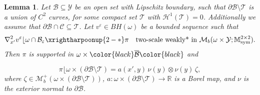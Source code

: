 \documentclass[reqno,10pt]{amsart}
\numberwithin{equation}{section}
\newtheorem{lemma}[theorem]{Lemma}
\theoremstyle{remark}
\newcommand{\RED}{\color{black}}
\newcommand{\BLACK}{\color{black}}
\newcommand{\calB}{\mathcal{B}}
\newcommand{\calC}{\mathcal{C}}
\newcommand{\calH}{\mathcal{H}}
\newcommand{\M}{\mathbb{M}}
\newcommand{\R}{\mathbb{R}}
\newcommand{\calT}{\mathcal{T}}
\newcommand{\calY}{\mathcal{Y}}
\DeclareMathOperator{\sym}{sym}
\newcommand{\closure}[1]{\overline{#1}}
\newcommand{\weakstartwoscale}{\xrightharpoonup{2-*}}
\newcommand{\eps}{\varepsilon}
\newcommand{\Mb}{\mathcal{M}_b}
\newcommand{\mres}[1]{\lfloor{#1}}
\newcommand{\D}{\nabla}
\begin{document}
\begin{lemma} \label{two-scale rank-1 lemma BH}
Let $\calB \subseteq \calY$ be an open set with Lipschitz boundary, such that $\partial\calB \setminus \calT$ is a union of
$C^2$ curves, 
for some compact set $\calT$ with $\calH^{1}(\calT) = 0$. 
Additionally we assume that $\partial\calB \cap \calC \subseteq \calT$. 
Let $v^\eps \in BH(\omega)$ be a bounded sequence such that 
\begin{equation*}
	{\D}^2_{x'}v^\eps\mres{\omega \cap \calB_\eps} \weakstartwoscale \pi \quad \text{two-scale weakly* in $\Mb(\omega \times \calY;\M^{2 \times 2}_{\sym})$}.
\end{equation*}
Then $\pi$ is supported in $\omega \times {\RED\closure{\calB}\BLACK}$ and

\begin{equation} \label{two-scale rank-1 structure BH - C^2 bdry}
	\pi\mres{\omega \times (\partial\calB \setminus \calT)} = a(x',y)\, \nu(y) \otimes \nu(y) \,\zeta,
\end{equation}
where $\zeta \in \Mb^+(\omega \times (\partial\calB \setminus \calT))$, $a : \omega \times (\partial\calB \setminus \calT) \to \R$ is a Borel map, and $\nu$ is the exterior normal to $\partial\calB$.
\end{lemma}
\end{document}
